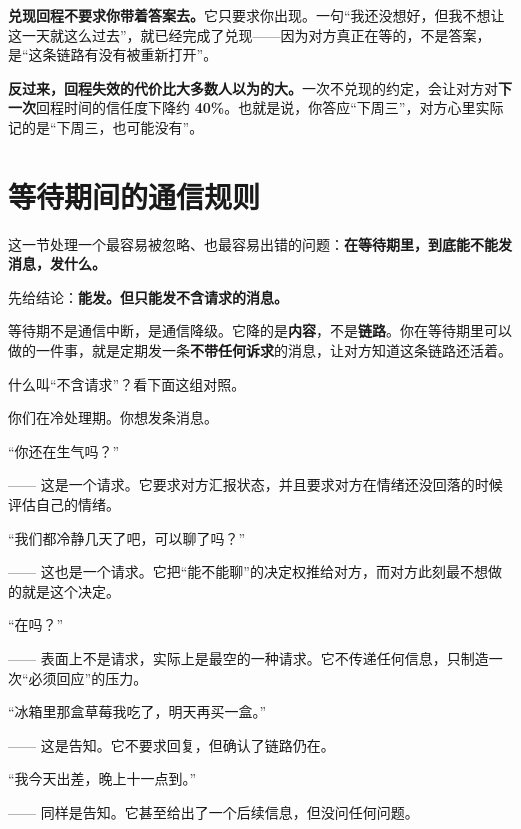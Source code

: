 \textbf{兑现回程不要求你带着答案去。}它只要求你出现。一句“我还没想好，但我不想让这一天就这么过去”，就已经完成了兑现——因为对方真正在等的，不是答案，是“这条链路有没有被重新打开”。

\textbf{反过来，回程失效的代价比大多数人以为的大。}一次不兑现的约定，会让对方对\textbf{下一次}回程时间的信任度下降约 \textbf{40\%}。也就是说，你答应“下周三”，对方心里实际记的是“下周三，也可能没有”。

\section{等待期间的通信规则}

这一节处理一个最容易被忽略、也最容易出错的问题：\textbf{在等待期里，到底能不能发消息，发什么。}

先给结论：\textbf{能发。但只能发不含请求的消息。}

等待期不是通信中断，是通信降级。它降的是\textbf{内容}，不是\textbf{链路}。你在等待期里可以做的一件事，就是定期发一条\textbf{不带任何诉求}的消息，让对方知道这条链路还活着。

什么叫“不含请求”？看下面这组对照。

\begin{mdquote}


\vspace{0.3\baselineskip}

你们在冷处理期。你想发条消息。

\vspace{0.3\baselineskip}

“你还在生气吗？”\par
—— 这是一个请求。它要求对方汇报状态，并且要求对方在情绪还没回落的时候评估自己的情绪。

\vspace{0.3\baselineskip}

“我们都冷静几天了吧，可以聊了吗？”\par
—— 这也是一个请求。它把“能不能聊”的决定权推给对方，而对方此刻最不想做的就是这个决定。

\vspace{0.3\baselineskip}

“在吗？”\par
—— 表面上不是请求，实际上是最空的一种请求。它不传递任何信息，只制造一次“必须回应”的压力。

\vspace{0.3\baselineskip}

“冰箱里那盒草莓我吃了，明天再买一盒。”\par
—— 这是告知。它不要求回复，但确认了链路仍在。

\vspace{0.3\baselineskip}

“我今天出差，晚上十一点到。”\par
—— 同样是告知。它甚至给出了一个后续信息，但没问任何问题。
\end{mdquote}

